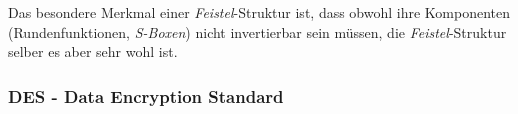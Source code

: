 
Das besondere Merkmal einer \textit{Feistel}-Struktur ist, dass obwohl ihre Komponenten (Rundenfunktionen, \textit{S-Boxen}) nicht invertierbar sein müssen, die \textit{Feistel}-Struktur selber es aber sehr wohl ist.

\subsubsection{DES - Data Encryption Standard}
\label{sssec:des}


%
%
%
%

